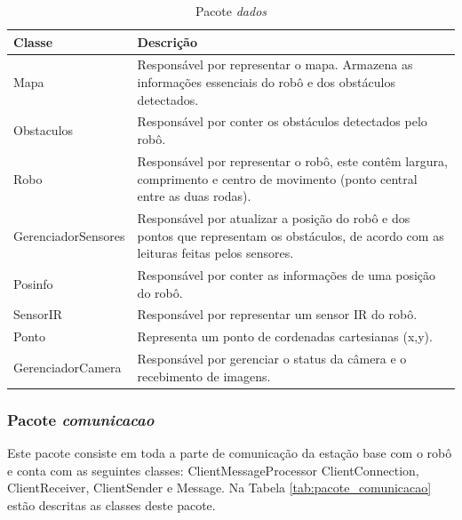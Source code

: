 \begin{table}[H]
  \centering
  \caption{Pacote \textit{dados}}
  \begin{tabular}{p{6cm}p{8cm}}
    \toprule
    \textbf{Classe} & \textbf{Descrição} \\ 
    \midrule
    Mapa  & Responsável por representar o mapa. Armazena as informações essenciais do robô e dos obstáculos detectados. \\ \hline
    Obstaculos & Responsável por conter os obstáculos detectados pelo robô. \\ \hline
    Robo  & Responsável por representar o robô, este contêm largura, comprimento e centro de movimento (ponto central entre as duas rodas). \\ \hline
    GerenciadorSensores & Responsável por atualizar a posição do robô e dos pontos que representam os obstáculos, de acordo com as leituras feitas pelos sensores. \\ \hline
    Posinfo & Responsável por conter as informações de uma posição do robô. \\ \hline
    SensorIR & Responsável por representar um sensor IR do robô. \\ \hline 
    Ponto & Representa um ponto de cordenadas cartesianas (x,y). \\ \hline
    GerenciadorCamera & Responsável por gerenciar o status da câmera e o recebimento de imagens. \\ 
    \bottomrule
  \end{tabular}%
  \label{tab:pacote_controle}%
\end{table}%

\subsubsection{Pacote \textit{comunicacao}}
\label{subsec:pacote_comunicacao}

Este pacote consiste em toda a parte de comunicação da estação base com o robô e conta com as seguintes classes: ClientMessageProcessor ClientConnection, ClientReceiver, ClientSender e Message. Na Tabela \ref{tab:pacote_comunicacao} estão descritas as classes deste pacote.

